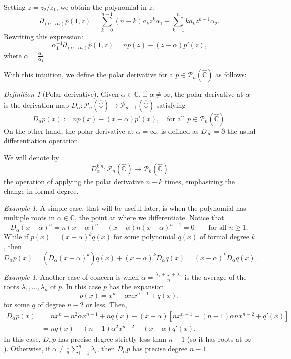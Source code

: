 \documentclass[reqno,11pt]{amsart}
\theoremstyle{remark}
\newtheorem{definition}[theorem]{Definition}
\newtheorem{example}[theorem]{Example}
\newcommand{\cc}{\mathbb{C}}
\newcommand{\polar}[1]{D_{#1}}
\newcommand{\polars}[3]{D_{#1}^{#2|#3}}
\newcommand{\pol}{\mathcal{P}}
\begin{document}
Setting \( z = z_2/z_1 \), we obtain the polynomial in \( z \):
\[
\partial_{(\alpha_1:\alpha_2)} \hat{p}(1, z) = \sum_{k=0}^{n-1} (n-k) a_k z^{k} \alpha_1 + \sum_{k=1}^{n} k a_k z^{k-1} \alpha_2.
\]
Rewriting this expression:
\[
\alpha_1^{-1}\partial_{(\alpha_1:\alpha_2)} \hat{p}(1, z) = n p(z) - (z - \alpha) p'(z),
\]
where \( \alpha = \frac{\alpha_2}{\alpha_1} \).

With this intuition, we define the polar derivative for a $p\in \pol_n(\hat{\cc})$ as follows:


\begin{definition}[Polar derivative]
 Given $\alpha\in \cc$, if $ \alpha\neq \infty $, the polar derivative at $\alpha$ is the derivation map $ \polar{\alpha}:\pol_n(\hat{\cc})\to  \pol_{n-1}(\hat{\cc}) $ satisfying
$$ \polar{\alpha}p(x) := np(x) - (x-\alpha)p'(x),\quad \text{for all } p\in \pol_n(\hat{\cc}).  $$
On the other hand, the polar derivative at $\alpha = \infty $, is defined as $ \polar{\infty} = \partial $ the usual differentiation operation.

We will denote by
$$ \polars{\alpha}{k}{n}:\pol_n(\hat{\cc})\to  \pol_{k}(\hat{\cc})  $$
the operation of applying the polar derivative $n-k$ times, emphasizing the change in formal degree.

\end{definition}

\begin{example}
A simple case, that will be useful later, is when the polynomial has multiple roots in $\alpha\in \cc$, the point at where we differentiate. Notice that
$$\polar{\alpha}(x-\alpha)^n = n(x-\alpha)^n - (x-\alpha)n(x-\alpha)^{n-1} = 0 \qquad \text{for all } n\geq 1,$$
While if  $ p(x) = (x-\alpha)^kq(x)$ for some polynomial $q(x)$ of formal degree $k$, then
$$ \polar{\alpha} p(x) = (\polar{\alpha}(x-\alpha)^k )q(x)+(x-\alpha)^k \polar{\alpha} q(x) = (x-\alpha)^k \polar{\alpha} q(x).$$
\end{example}

\begin{example}\label{eg:precisedegreeofpolar}
Another case of concern is when $\alpha=\frac{\lambda_1+\dots+\lambda_n}{n} $ is the average of the roots $\lambda_1,\dots, \lambda_n $ of $p$. In this case $p$ has the expansion 
$$ p(x) = x^n - \alpha n x^{n-1}+q(x),$$ for some $q$ of degree $n-2$ or less. Then,
\begin{align*}
 \polar{\alpha} p(x) &= nx^n-n^2\alpha x^{n-1} +nq(x)-(x-\alpha)\left[n x^{n-1} - (n-1)\alpha n x^{n-2}+ q'(x) \right]   \\
 & = nq(x) -(n-1)\alpha^2 x^{n-2}-(x-\alpha)q'(x).
\end{align*} 
In this case,  $\polar{\alpha} p$ has precise degree strictly less than $n-1$ (so it has roots at $\infty$). Otherwise, if $\alpha\neq \frac{1}{n}\sum_{i=1}^n \lambda_i$, then $\polar{\alpha} p$ has precise degree $n-1$.
\end{example}
\end{document}
